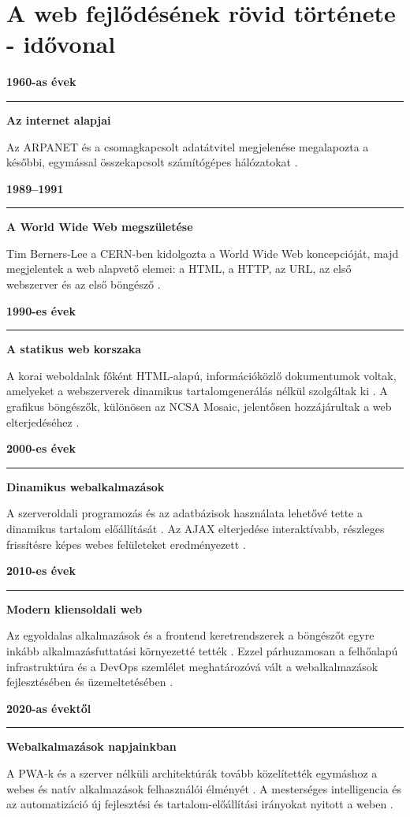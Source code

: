 \section{A web fejlődésének rövid története - idővonal}

\newcommand{\timelineentry}[3]{%
\noindent
\begin{minipage}[t]{0.18\textwidth}
\raggedleft\textbf{\textcolor{blue!70!black}{#1}}
\end{minipage}
\hfill
\begin{minipage}[t]{0.03\textwidth}
\centering\textcolor{blue!70!black}{\rule{1pt}{1.7cm}}
\end{minipage}
\hfill
\begin{minipage}[t]{0.74\textwidth}
\textbf{#2}\par
#3
\end{minipage}
\par\vspace{0.8em}
}

\timelineentry{1960-as évek}{Az internet alapjai}{
Az ARPANET és a csomagkapcsolt adatátvitel megjelenése megalapozta a későbbi, egymással összekapcsolt számítógépes hálózatokat \cite{britannicaArpanet,computerHistoryInternet}.
}

\timelineentry{1989--1991}{A World Wide Web megszületése}{
Tim Berners-Lee a CERN-ben kidolgozta a World Wide Web koncepcióját, majd megjelentek a web alapvető elemei: a HTML, a HTTP, az URL, az első webszerver és az első böngésző \cite{cern2024www35,w3cLittleWebHistory}.
}

\timelineentry{1990-es évek}{A statikus web korszaka}{
A korai weboldalak főként HTML-alapú, információközlő dokumentumok voltak, amelyeket a webszerverek dinamikus tartalomgenerálás nélkül szolgáltak ki \cite{mdnWebServer}. A grafikus böngészők, különösen az NCSA Mosaic, jelentősen hozzájárultak a web elterjedéséhez \cite{nsf2004mosaic}.
}

\timelineentry{2000-es évek}{Dinamikus webalkalmazások}{
A szerveroldali programozás és az adatbázisok használata lehetővé tette a dinamikus tartalom előállítását \cite{mdnServerSideIntro}. Az AJAX elterjedése interaktívabb, részleges frissítésre képes webes felületeket eredményezett \cite{garrett2005ajax,mdnAjax}.
}

\timelineentry{2010-es évek}{Modern kliensoldali web}{
Az egyoldalas alkalmazások és a frontend keretrendszerek a böngészőt egyre inkább alkalmazásfuttatási környezetté tették \cite{mdnSpa,mdnClientFrameworks}. Ezzel párhuzamosan a felhőalapú infrastruktúra és a DevOps szemlélet meghatározóvá vált a webalkalmazások fejlesztésében és üzemeltetésében \cite{mell2011nistCloud,dora2018accelerate}.
}

\timelineentry{2020-as évektől}{Webalkalmazások napjainkban}{
A PWA-k és a szerver nélküli architektúrák tovább közelítették egymáshoz a webes és natív alkalmazások felhasználói élményét \cite{mdnWhatIsPwa,aws2014lambda}. A mesterséges intelligencia és az automatizáció új fejlesztési és tartalom-előállítási irányokat nyitott a weben \cite{httpArchive2025GenerativeAi}.
}
